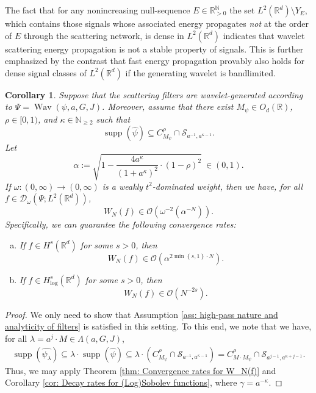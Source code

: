 \documentclass[11pt]{amsart}
\newcommand{\R}{{\mathbb{R}}}
\newcommand{\N}{\mathbb{N}}
\newcommand{\s}{\mathcal{S}}
\newcommand{\set}[1]{\ensuremath{\left\{\text{}#1\text{}\right\}}}
\DeclareMathOperator{\Wav}{Wav}
\DeclareMathOperator{\supp}{supp}
\newtheorem{corollary}[theorem]{Corollary}
\newenvironment{proof sketch} {\textit{Proof sketch.}}{}
\begin{document}
  The fact that for any nonincreasing null-sequence $E \in \R_{>0}^\N$ the set $L^2(\R^d)\setminus Y_E$, which contains those signals whose associated energy propagates \textit{not} at the order of $E$ through the scattering network, is dense in $L^2(\R^d)$ indicates that wavelet scattering energy propagation is not a stable property of signals. This is further emphasized by the contrast that fast energy propagation provably also holds for dense signal classes of $L^2(\R^d)$ if the generating wavelet is bandlimited.
  
  
  \begin{corollary}\label{cor: Wavelet decay rates}
    Suppose that the scattering filters are wavelet-generated according to $\Psi=\Wav(\psi,a,G,J)$. Moreover, assume that there exist $M_{\psi} \in O_d(\R)$, $\rho \in [0,1)$, and $\kappa \in \N_{\geq 2}$ such that
    \[\supp(\widehat{\psi})\subseteq C_{M_{\psi}}^{\rho} \cap \s_{a^{-1},a^{\kappa-1}}.\] 
    Let \[\alpha:=\sqrt{1-\frac{4a^\kappa}{(1+a^\kappa)^2}\cdot (1-\rho)^2} \: \in (0,1).\] 
    If $\omega:(0,\infty)\to (0,\infty)$ is a weakly $t^2$-dominated weight, then we have, for all $f \in \mathcal{D}_\omega(\Psi;L^2(\R^d))$,
    \[W_N(f)\in \mathcal{O}(\omega^{-2}(\alpha^{-N})).\]
    Specifically, we can guarantee the following convergence rates:
    \begin{enumerate}[a)]
      \item If $f \in H^s(\R^d)$ for some $s>0$, then 
      \[W_N(f) \in \mathcal{O}(\alpha^{2\min\set{s,1}\cdot N}).\] 
      \item If $f \in H^s_{\log}(\R^d)$ for some $s>0$, then 
      \[W_N(f)\in \mathcal{O}(N^{-2s}).\] 
    \end{enumerate}
  \end{corollary}
  
  \begin{proof}
    We only need to show that Assumption \ref{ass: high-pass nature and analyticity of filters} is satisfied in this setting. To this end, we note that we have, for all $\lambda=a^j\cdot M \in \Lambda(a,G,J)$, 
    \begin{align*}
      \supp(\widehat{\psi_\lambda})\subseteq \lambda \cdot \supp(\widehat{\psi}) \subseteq \lambda \cdot \left(C_{M_{\psi}}^{\rho} \cap \s_{a^{-1},a^{\kappa-1}}\right) = C_{M \cdot M_{\psi}}^{\rho} \cap \s_{a^{j-1},a^{\kappa+j-1}}.
    \end{align*}
    Thus, we may apply Theorem \ref{thm: Convergence rates for W_N(f)} and Corollary \ref{cor: Decay rates for (Log)Sobolev functions}, where $\gamma=a^{-\kappa}$.
  \end{proof}
  
\end{document}
